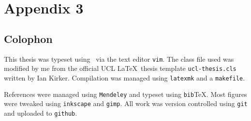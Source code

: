 \chapter{Appendix 3}

\section{Colophon}

This thesis was typeset using \XeLaTeX\ via the text editor \texttt{vim}.
The class file used was modified by me from the official UCL \LaTeX\ thesis template 
\texttt{ucl-thesis.cls} written by Ian Kirker. Compilation was managed using
\texttt{latexmk} and a \texttt{makefile}.

References were managed using \texttt{Mendeley} and typeset using \texttt{bib}{\TeX}.
Most figures were tweaked using \texttt{inkscape} and \texttt{gimp}.
All work was version controlled using \texttt{git} and uploaded to \texttt{github}. 


